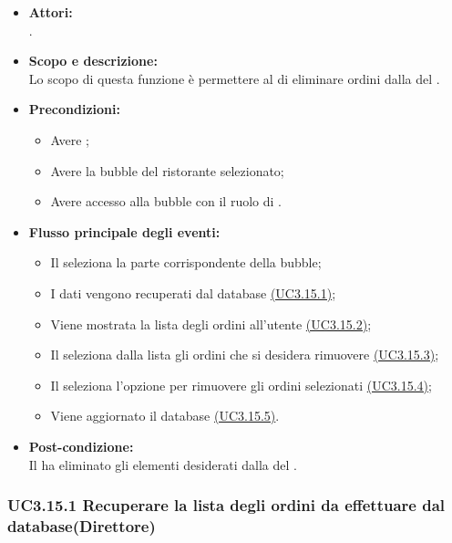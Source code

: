 \begin{itemize}
	\item \textbf{Attori:}
	\\.
	\item \textbf{Scopo e descrizione:} 
	\\Lo scopo di questa funzione è permettere al  di eliminare ordini dalla  del .
	\item \textbf{Precondizioni:}
	\begin{itemize}
		\item Avere ;
		\item Avere la bubble del ristorante selezionato;
		\item Avere accesso alla bubble con il ruolo di .
	\end{itemize}
	\item \textbf{Flusso principale degli eventi:}
	\begin{itemize}
		\item Il  seleziona la parte corrispondente della bubble;
		\item I dati vengono recuperati dal database \hyperref[UC3.15.1]{(UC3.15.1)};
		\item Viene mostrata la lista degli ordini all’utente \hyperref[UC3.15.2]{(UC3.15.2)};
		\item Il  seleziona dalla lista gli ordini che si desidera rimuovere \hyperref[UC3.15.3]{(UC3.15.3)};
		\item Il  seleziona l’opzione per rimuovere gli ordini selezionati \hyperref[UC3.15.4]{(UC3.15.4)};
		\item Viene aggiornato il database \hyperref[UC3.15.5]{(UC3.15.5)}.
	\end{itemize}
	\item \textbf{Post-condizione:}
	\\Il {} ha eliminato gli elementi desiderati dalla  del .
\end{itemize}

\subsubsection{UC3.15.1 Recuperare la lista degli ordini da effettuare dal database(Direttore)} \label{UC3.15.1}

